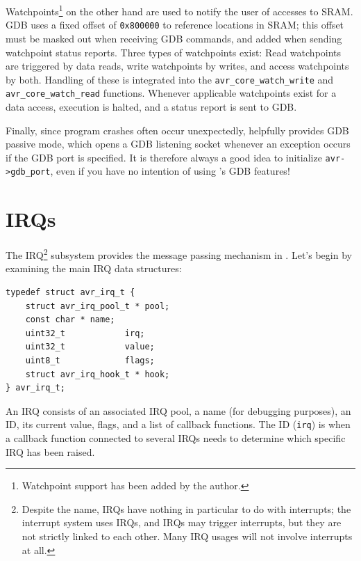 Watchpoints\footnote{Watchpoint support has been added by the author.}
on the other hand are used to notify the user of accesses to \ac{SRAM}.
\ac{GDB} uses a fixed offset of \lstinline|0x800000| to reference locations in
\ac{SRAM}; this offset must be masked out when receiving \ac{GDB} commands, and
added when sending watchpoint status reports.
Three types of watchpoints exist: Read watchpoints are triggered by data reads,
write watchpoints by writes, and access watchpoints by both. Handling of these
is integrated into the \lstinline|avr_core_watch_write| and
\lstinline|avr_core_watch_read| functions. Whenever applicable watchpoints exist
for a data access, execution is halted, and a status report is sent to \ac{GDB}.

Finally, since program crashes often occur unexpectedly, \simavr helpfully
provides \ac{GDB} passive mode, which
opens a \ac{GDB} listening socket whenever an exception occurs if the \ac{GDB}
port is specified. It is therefore always a good idea to initialize \lstinline|avr->gdb_port|, even
if you have no intention of using \simavr's \ac{GDB} features!


\section{\acfp{IRQ}}

The \acf{IRQ}\footnote{
%
Despite the name, \acp{IRQ} have nothing in particular to do with interrupts;
the interrupt system uses \acp{IRQ}, and \acp{IRQ} may trigger interrupts, but
they are not strictly linked to each other. Many \ac{IRQ} usages will not involve
interrupts at all.}
%
subsystem provides the message passing mechanism in \simavr. Let's begin
by examining the main \ac{IRQ} data structures:

\begin{lstlisting}
typedef struct avr_irq_t {
    struct avr_irq_pool_t * pool;
    const char * name;
    uint32_t            irq;
    uint32_t            value;
    uint8_t             flags;
    struct avr_irq_hook_t * hook;
} avr_irq_t;
\end{lstlisting}

An \ac{IRQ} consists of an associated \ac{IRQ} pool, a name (for debugging
purposes), an \ac{ID}, its current value, flags, and a list of callback functions.
The \ac{ID} (\lstinline|irq|) is when a callback function connected to several \acp{IRQ}
needs to determine which specific \ac{IRQ} has been raised.

